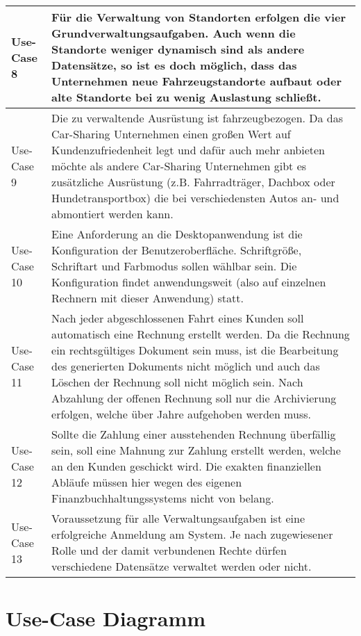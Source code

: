 \begin{tabular}{l | p{13cm}}
    \hline
    Use-Case 8 & Für die Verwaltung von Standorten erfolgen die vier Grundverwaltungsaufgaben. Auch wenn die Standorte weniger dynamisch sind als andere Datensätze, so ist es doch möglich, dass das Unternehmen neue Fahrzeugstandorte aufbaut oder alte Standorte bei zu wenig Auslastung schließt. \\
    \hline
    Use-Case 9 & Die zu verwaltende Ausrüstung ist fahrzeugbezogen. Da das Car-Sharing Unternehmen einen großen Wert auf Kundenzufriedenheit legt und dafür auch mehr anbieten möchte als andere Car-Sharing Unternehmen gibt es zusätzliche Ausrüstung (z.B. Fahrradträger, Dachbox oder Hundetransportbox) die bei verschiedensten Autos an- und abmontiert werden kann. \\
    \hline
    Use-Case 10 & Eine Anforderung an die Desktopanwendung ist die Konfiguration der Benutzeroberfläche. Schriftgröße, Schriftart und Farbmodus sollen wählbar sein. Die Konfiguration findet anwendungsweit (also auf einzelnen Rechnern mit dieser Anwendung) statt.\\
    \hline
    Use-Case 11 & Nach jeder abgeschlossenen Fahrt eines Kunden soll automatisch eine Rechnung erstellt werden. Da die Rechnung ein rechtsgültiges Dokument sein muss, ist die Bearbeitung des generierten Dokuments nicht möglich und auch das Löschen der Rechnung soll nicht möglich sein. Nach Abzahlung der offenen Rechnung soll nur die Archivierung erfolgen, welche über Jahre aufgehoben werden muss.\\ 
    \hline
    Use-Case 12 & Sollte die Zahlung einer ausstehenden Rechnung überfällig sein, soll eine Mahnung zur Zahlung erstellt werden, welche an den Kunden geschickt wird. Die exakten finanziellen Abläufe müssen hier wegen des eigenen Finanzbuchhaltungssystems nicht von belang. \\
    \hline
    Use-Case 13 & Voraussetzung für alle Verwaltungsaufgaben ist eine erfolgreiche Anmeldung am System. Je nach zugewiesener Rolle und der damit verbundenen Rechte dürfen verschiedene Datensätze verwaltet werden oder nicht.\\
    \hline

\end{tabular}

\newpage

\section{Use-Case Diagramm}

